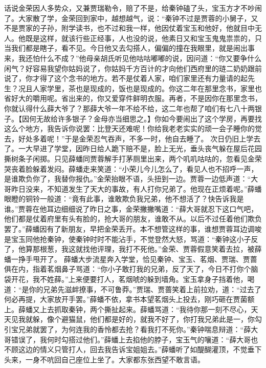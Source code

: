 \documentclass[12pt,oneside]{book}
\begin{document}
话说金荣因人多势众，又兼贾瑞勒令，赔了不是，给秦钟磕了头，宝玉方才不吵闹了。大家散了学，金荣回到家中，越想越气，说：“秦钟不过是贾蓉的小舅子，又不是贾家的子孙，附学读书，也不过和我一样，他因仗着宝玉和他好，他就目中无人。他既是这样，就该行些正经事，人也没的说，他素日又和宝玉鬼鬼祟祟的，只当我们都是瞎子，看不见。今日他又去勾搭人，偏偏的撞在我眼里，就是闹出事来，我还怕什么不成？”他母亲胡氏听见他咕咕嘟嘟的说，因问道：“你又要争什么闲气？好容易我望你姑妈说了，你姑妈千方百计的才向他们西府里的琏二奶奶跟前说了，你才得了这个念书的地方。若不是仗着人家，咱们家里还有力量请的起先生？况且人家学里，茶也是现成的，饭也是现成的。你这二年在那里念书，家里也省好大的嚼用呢。省出来的，你又爱穿件鲜明衣服。再者，不是因你在那里念书，你就认得什么薛大爷了？那薛大爷一年不给不给，这二年也帮了咱们有七八十两银子。【因何无故给许多银子？金母亦当细思之。】你如今要闹出了这个学房，再要找这么个地方，我告诉你说罢：比登天还难呢！你给我老老实实的顽一会子睡你的觉去，好处多着呢！”于是金荣忍气吞声，不多一时，他自去睡了。
次日仍旧上学去了。一大早进了学堂，因昨日给人跪下赔不是，脸上无光，垂头丧气躲在屋后花园撕树条子闲掷。只见薛蟠同贾蓉解手打茅厕里出来，两个叽叽咕咕的，忽看见金荣哭丧着脸躲着发闷。薛蟠走来笑道：“小荣儿今儿怎么了，看见人也不招呼一声，是谁欺负你了，我替你报仇。”金荣抬眼不语，头扭到一边。贾蓉一边低声道：“大哥昨日没来，不知道发生了天大的事故，有人打你兄弟了。他现在正烦着呢。”薛蟠眼瞪的铜铃一般道：“竟有此事，谁敢欺负我兄弟，他不想活了？快告诉我是谁。”贾蓉在他耳边细细说了昨日之事，金荣撇撇嘴道：“薛大哥就忍下这口气吧，他们都是仗着府里有头有脸的，抢大哥的朋友，谁敢不从。以后不过任着他们欺负罢了。”薛蟠因有了新朋友，早把金荣丢开。本不想管这样的事，谁想贾蓉耳边调唆是宝玉同他抢秦钟，使秦钟时时不能沾手，不觉登然大怒，骂道：“秦钟这小子反了，他算那根葱，我这就找他评理，我打不死他。”金荣、贾蓉假意笑着去拉，被薛蟠一挣手甩开了。
薛蟠大步流星奔入学堂，恰见秦钟、宝玉、茗烟、贾瑞、贾蔷俱在内，指着茗烟鼻子骂道：“你小子敢打我的兄弟，反了天了，今日不打你个脑袋开花，我不姓薛。”上来便要打人，茗烟唬的躲到墙角。宝玉拿身子挡着他，喝道：“是你的兄弟先滋衅撩事，不可鲁莽。”贾瑞、贾蔷笑着上前拉劝，道：“过去了何必再提，大家放开手罢。”薛蟠不依，拿书本望茗烟头上投去，刚巧砸在贾菌额上。薛蟠又上去抓取秦钟，两个撕扯起来。薛蟠骂道：“我待你那一刻不尽心，天天见我就躲，像个避猫鼠，他们都是好的，就我不好了，你打我兄弟此是一，你勾引宝兄弟就罢了，为何连我的香怜都去抢？看我打不死你。”秦钟喘息辩道：“薛大哥错误了，我何时勾搭过他们。”薛蟠上去掐他的脖子，宝玉气的嚷道：“薛大哥也不顾这边的情义只管打人，回去我告诉宝姐姐去。”薛蟠听了如醍醐灌顶，不觉垂下头来，一身不吭回自己座位上坐了。大家都东张西望不敢言语。　
\end{document}
